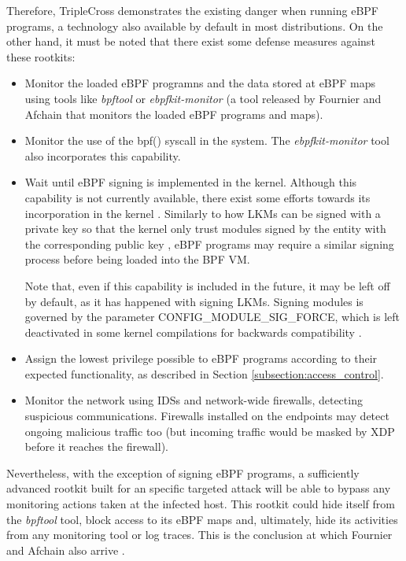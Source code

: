 Therefore, TripleCross demonstrates the existing danger when running eBPF programs, a technology also available by default in most distributions. On the other hand, it must be noted that there exist some defense measures against these rootkits:
\begin{itemize}
\item Monitor the loaded eBPF programns and the data stored at eBPF maps using tools like \textit{bpftool} or \textit{ebpfkit-monitor} \cite{ebpfkit_monitor_github} (a tool released by Fournier and Afchain that monitors the loaded eBPF programs and maps).
\item Monitor the use of the bpf() syscall in the system. The \textit{ebpfkit-monitor} tool also incorporates this capability.
\item Wait until eBPF signing is implemented in the kernel. Although this capability is not currently available, there exist some efforts towards its incorporation in the kernel \cite{bpf_signing}. Similarly to how LKMs can be signed with a private key so that the kernel only trust modules signed by the entity with the corresponding public key \cite{lkm_signing}, eBPF programs may require a similar signing process before being loaded into the BPF VM.

Note that, even if this capability is included in the future, it may be left off by default, as it has happened with signing LKMs. Signing modules is governed by the parameter CONFIG\_MODULE\_SIG\_FORCE, which is left deactivated in some kernel compilations for backwards compatibility \cite{arch_linux_sign}.
\item Assign the lowest privilege possible to eBPF programs according to their expected functionality, as described in Section \ref{subsection:access_control}.
\item Monitor the network using IDSs and network-wide firewalls, detecting suspicious communications. Firewalls installed on the endpoints may detect ongoing malicious traffic too (but incoming traffic would be masked by XDP before it reaches the firewall).
\end{itemize}

Nevertheless, with the exception of signing eBPF programs, a sufficiently advanced rootkit built for an specific targeted attack will be able to bypass any monitoring actions taken at the infected host. This rootkit could hide itself from the \textit{bpftool} tool, block access to its eBPF maps and, ultimately, hide its activities from any monitoring tool or log traces. This is the conclusion at which Fournier and Afchain also arrive \cite{ebpf_friends_54}.

